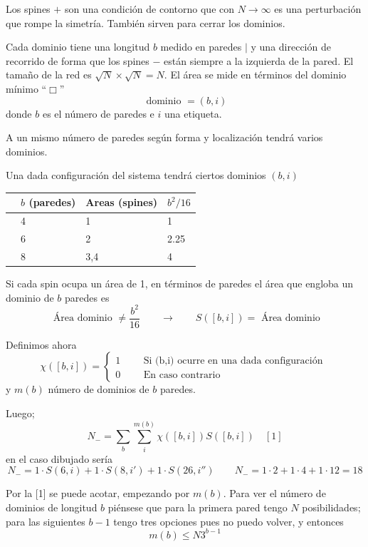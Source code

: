 \documentclass[10pt,oneside]{CBFT_book}
\begin{document}
Los spines $+$ son una condición de contorno que con $N\to\infty$ es una perturbación que rompe la
simetría. También sirven para cerrar los dominios.

Cada dominio tiene una longitud $b$ medido en paredes $|$ y una dirección de recorrido de forma que 
los spines $-$ están siempre a la izquierda de la pared.
El tamaño de la red es $\sqrt{N} \times \sqrt{N} = N$. El área se mide en términos del dominio 
mínimo ``$\Box$''
\[
	\text{ dominio } = (b,i)
\]
donde $b$ es el número de paredes e $i$ una etiqueta.

A un mismo número de paredes según forma y localización tendrá varios dominios.

Una dada configuración del sistema tendrá ciertos dominios $(b,i)$

\begin{center}
\begin{tabular}{llll}
 & $b$ (paredes) & Areas (spines) & $b^2/16$ \\
\hline
 & 4 & 1 & 1\\
 & 6 & 2 & 2.25\\
 & 8 & 3,4 & 4
\end{tabular}
\end{center}

Si cada spin ocupa un área de 1, en términos de paredes el área que engloba un dominio de $b$ paredes
es 
\[
	\text{ Área dominio } \neq \frac{b^2}{16} \qquad \rightarrow \qquad S([b,i]) = \text{ Área dominio}
\]

Definimos ahora 
\[
	\chi([b,i]) = \begin{cases}
	              1 \qquad \text{ Si (b,i) ocurre en una dada configuración } \\
	              0 \qquad \text{ En caso contrario}
	             \end{cases}
\]
y $m(b)$ número de dominios de $b$ paredes.

Luego;
\[
	\boxed{ N_- = \sum_b \sum_i^{m(b)} \chi([b,i]) S([b,i]) } \quad [1]
\]
en el caso dibujado sería
\[
	N_- = 1 \cdot S(6,i) + 1 \cdot S(8,i') + 1 \cdot S(26,i'') \qquad 
	N_- = 1 \cdot  2 + 1 \cdot  4 + 1 \cdot 12 = 18
\]

Por la [1] se puede acotar, empezando por $m(b)$. Para ver el número de dominios de longitud $b$ piénsese que 
para la primera pared tengo $N$ posibilidades; para las siguientes $b-1$ tengo tres opciones pues no puedo volver,
y entonces 
\[
	m(b) \leq N 3^{b-1}
\]
\end{document}
